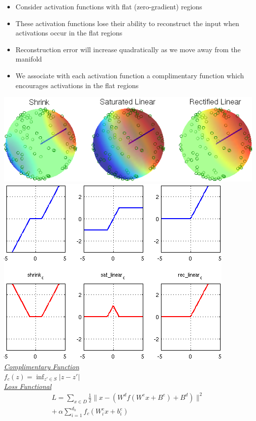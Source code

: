 \documentclass[paperwidth=38in,paperheight=28in,landscape,fontscale=0.4]{baposter}
\newcommand{\compresslist}{%
\setlength{\itemsep}{1pt}%
\setlength{\parskip}{0pt}%
\setlength{\parsep}{0pt}%
}
\begin{document}
\begin{poster}
{
\begin{itemize}\compresslist
\item Consider activation functions with flat (zero-gradient) regions 
\item These activation functions lose their ability to reconstruct the input when activations occur in the flat regions
\item Reconstruction error will increase quadratically as we move away from the manifold 
\item We associate with each activation function a complimentary function which encourages activations in the flat regions 
\end{itemize} 
\begin{center}     
\includegraphics[scale=0.43]{viz_nonlin.png} \\
\includegraphics[scale=0.53]{compliments.png} \vspace*{2mm} 
\emph{\uline {Complimentary Function}} \\
$f_c(z) = \inf_ {z' \in S} |z-z'|$ \\
\vspace{2mm} 
\emph{\uline {Loss Functional}} 
\begin{multline} \nonumber 
L =\sum_{x \in D} \frac{1}{2} \|x-\left(W^d f(W^e x+B^e)+B^d\right)\|^2 \\ 
 + ~\alpha \sum_{i=1}^{d_h}f_c(W^e_i x + b^e_i)
\end{multline} 
\end{center}  
}


\end{poster}
\end{document}
